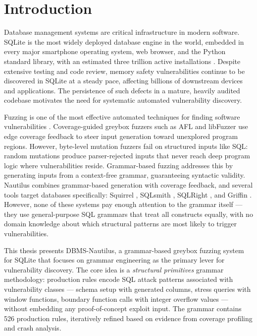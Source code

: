 \chapter{Introduction}
\label{chap:intro}

Database management systems are critical infrastructure in modern software. SQLite is the most widely deployed database engine in the world, embedded in every major smartphone operating system, web browser, and the Python standard library, with an estimated three trillion active installations \citep{sqlite}. Despite extensive testing and code review, memory safety vulnerabilities continue to be discovered in SQLite at a steady pace, affecting billions of downstream devices and applications. The persistence of such defects in a mature, heavily audited codebase motivates the need for systematic automated vulnerability discovery.

Fuzzing is one of the most effective automated techniques for finding software vulnerabilities \citep{fuzzingsurvey}. Coverage-guided greybox fuzzers such as AFL \citep{afl} and libFuzzer \citep{libfuzzer} use edge coverage feedback to steer input generation toward unexplored program regions. However, byte-level mutation fuzzers fail on structured inputs like SQL: random mutations produce parser-rejected inputs that never reach deep program logic where vulnerabilities reside. Grammar-based fuzzing addresses this by generating inputs from a context-free grammar, guaranteeing syntactic validity. Nautilus \citep{nautilus} combines grammar-based generation with coverage feedback, and several tools target databases specifically: Squirrel \citep{squirrel}, SQLsmith \citep{sqlsmith}, SQLRight \citep{sqlright}, and Griffin \citep{griffin}. However, none of these systems pay enough attention to the grammar itself --- they use general-purpose SQL grammars that treat all constructs equally, with no domain knowledge about which structural patterns are most likely to trigger vulnerabilities.

This thesis presents DBMS-Nautilus, a grammar-based greybox fuzzing system for SQLite that focuses on grammar engineering as the primary lever for vulnerability discovery. The core idea is a \textit{structural primitives} grammar methodology: production rules encode SQL attack patterns associated with vulnerability classes --- schema setup with generated columns, stress queries with window functions, boundary function calls with integer overflow values --- without embedding any proof-of-concept exploit input. The grammar contains 526 production rules, iteratively refined based on evidence from coverage profiling and crash analysis.


